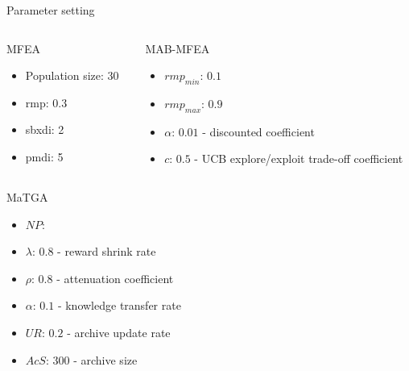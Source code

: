 \begin{frame}{Parameter setting}
    \begin{columns}
        \begin{column}{0.48\textwidth}
            \begin{exampleblock}{MFEA}
                \begin{itemize}
                    \item Population size: 30
                    \item rmp: 0.3
                    \item sbxdi: 2
                    \item pmdi: 5
                \end{itemize}
            \end{exampleblock}
        \end{column}
        \begin{column}{0.48\textwidth}
            \begin{exampleblock}{MAB-MFEA}
                \begin{itemize}
                    \item $rmp_{min}$: $0.1$
                    \item $rmp_{max}$: $0.9$
                    \item $\alpha$: $0.01$ - discounted coefficient
                    \item $c$: $0.5$ - UCB explore/exploit trade-off coefficient
                \end{itemize}
            \end{exampleblock}
        \end{column}
    \end{columns}
    \begin{exampleblock}{MaTGA}
        \begin{itemize}
            \item $NP$:
            \item $\lambda$: $0.8$ - reward shrink rate
            \item $\rho$: $0.8$ - attenuation coefficient
            \item $\alpha$: $0.1$ - knowledge transfer rate
            \item $UR$: $0.2$ - archive update rate
            \item $AcS$: $300$ - archive size
        \end{itemize}
    \end{exampleblock}
\end{frame}

